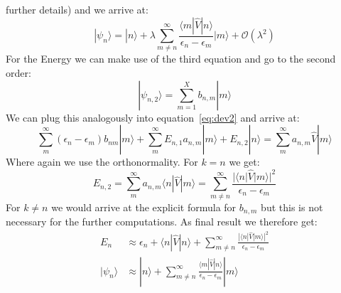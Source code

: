 further details) and we arrive
at:
\begin{equation}
    |\psi_{n}\rangle = |n\rangle + \lambda \sum_{m\neq n}^{\infty}
    \frac{\langle m |\hat{V}|n \rangle}{\epsilon_n - \epsilon_m}  
    |m \rangle  + \mathcal{O}(\lambda^2)
\end{equation}
For the Energy we can make use of the third equation and go to
the second order:
\begin{equation}
|\psi_{n,2}\rangle  = \sum_{m=1}^{X} b_{n,m} |m \rangle 
\end{equation}
We can plug this analogously into equation~\eqref{eq:dev2} and
arrive at:
\begin{equation}
 \sum_{m}^{\infty} (\epsilon_n - \epsilon_m) b_{nm} |m\rangle +
 \sum_{m}^{\infty} E_{n,1} a_{n,m} |m \rangle + E_{n,2} |n \rangle =
 \sum_{m}^{\infty} a_{n,m} \hat{V} |m \rangle
\end{equation}
Where again we use the orthonormality. For $k=n$ we get:
\begin{equation}
    E_{n,2} = \sum_{m}^{\infty} a_{n,m} \langle n |\hat{V}|m\rangle
= \sum_{m\neq n}^{\infty}\frac{|\langle n | \hat{V} | m \rangle |^2}
    {\epsilon_n - \epsilon_m}
\end{equation}
For $k\neq n$ we would arrive at the explicit formula for $b_{n,m}$
but this is not necessary for the further computations.
As final result we therefore get:
\begin{align}
    E_n &\approx \epsilon_n + \langle n|\hat{V} | n \rangle +
\sum_{m\neq n}^{\infty}\frac{|\langle n | \hat{V} | m \rangle |^2}
    {\epsilon_n - \epsilon_m} \\
    |\psi_n \rangle &\approx 
    |n\rangle + \sum_{m\neq n}^{\infty}
    \frac{\langle m |\hat{V}|n \rangle}{\epsilon_n - \epsilon_m}  
    |m \rangle 
\end{align}


